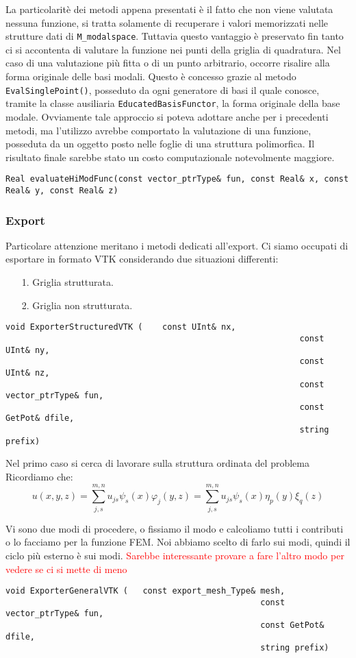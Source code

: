La particolarit\`e dei metodi appena presentati \`e il fatto che non viene valutata nessuna funzione, si tratta solamente di recuperare i valori memorizzati nelle strutture dati di \texttt{M\_modalspace}. Tuttavia questo vantaggio \`e preservato fin tanto ci si accontenta di valutare la funzione nei punti della griglia di quadratura. Nel caso di una valutazione pi\`u fitta o di un punto arbitrario, occorre risalire alla forma originale delle basi modali. Questo \`e concesso grazie al metodo \texttt{EvalSinglePoint()}, posseduto da ogni generatore di basi il quale conosce, tramite la classe ausiliaria  \texttt{EducatedBasisFunctor}, la forma originale della base modale. Ovviamente tale approccio si poteva adottare anche per i precedenti metodi, ma l'utilizzo avrebbe comportato la valutazione di una funzione, posseduta da un oggetto posto nelle foglie di una struttura polimorfica. Il risultato finale sarebbe stato un costo computazionale notevolmente maggiore.
\begin{lstlisting}[style = general, frame = none]
Real evaluateHiModFunc(const vector_ptrType& fun, const Real& x, const Real& y, const Real& z)
\end{lstlisting}


\subsubsection{Export}

Particolare attenzione meritano i metodi dedicati all'export. Ci siamo occupati di esportare in formato VTK considerando due situazioni differenti:
\begin{itemize}
\item[1.] Griglia strutturata.
\item[2.] Griglia non strutturata.
\end{itemize}
\begin{lstlisting}[style = general]
void ExporterStructuredVTK (	const UInt& nx,
															const UInt& ny,
															const UInt& nz,
															const vector_ptrType& fun,
															const GetPot& dfile, 
															string prefix)
\end{lstlisting}
Nel primo caso si cerca di lavorare sulla struttura ordinata del problema
Ricordiamo che:
\begin{equation}
u(x,y,z) = \sum_{j,s}^{m,n}u_{js}\psi_s(x)\varphi_j(y,z) = \sum_{j,s}^{m,n}u_{js}\psi_s(x)\eta_p(y)\xi_q(z)
\end{equation}

Vi sono due modi di procedere, o fissiamo il modo e calcoliamo tutti i contributi o lo facciamo per la funzione FEM.
Noi abbiamo scelto di farlo sui modi, quindi il ciclo pi\`u esterno \`e sui modi.
\textcolor{red}{Sarebbe interessante provare a fare l'altro modo per vedere se ci si mette di meno}

\begin{lstlisting}[style = general]
void ExporterGeneralVTK (	const export_mesh_Type& mesh,
													const vector_ptrType& fun,
													const GetPot& dfile,
													string prefix)
\end{lstlisting}


